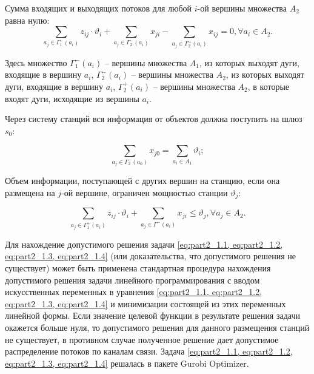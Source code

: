 
Сумма входящих и выходящих потоков для любой $i$-ой вершины множества $A_2$ равна нулю:
% 
\begin{equation}\label{eq:part2_1.2}
    \sum_{a_j \in \Gamma_1^-(a_i)} z_{ij} \cdot \vartheta_i + \sum_{a_j \in \Gamma_2^-(a_i)} x_{ji} -  \sum_{a_j \in \Gamma_2^+(a_i)} x_{ij} =0 ,\forall a_i \in A_2. 
\end{equation}

Здесь множество $\Gamma_1^-(a_i)$ – вершины множества $A_1$, из которых выходят дуги, входящие в вершину $a_i$, $\Gamma_2^-(a_i)$ – вершины множества $A_2$, из которых выходят дуги, входящие в  вершину $a_i$, $\Gamma_2^+(a_i)$ – вершины множества $A_2$, в которые входят дуги, исходящие из вершины $a_i$.

Через систему станций вся информация от объектов должна поступить  на шлюз $s_0$:

\begin{equation}\label{eq:part2_1.3}
    \sum_{a_j \in \Gamma_2^-(a_0)} x_{j0} =  \sum_{a_i \in A_1} \vartheta_i;
\end{equation}

Объем информации, поступающей с других вершин на станцию, если она размещена на $j$-ой вершине, ограничен мощностью станции $\vartheta_j$:

\begin{equation}\label{eq:part2_1.4}
    \sum_{a_j \in \Gamma_1^+(a_i)} z_{ij} \cdot \vartheta_i + \sum_{a_j \in \Gamma^-(a_i)} x_{ji} \leqslant \vartheta_j, \forall a_j \in A_2.
\end{equation}

Для нахождение допустимого решения задачи \cref{eq:part2_1.1, eq:part2_1.2, eq:part2_1.3, eq:part2_1.4} (или доказательства, что допустимого решения не существует) может быть применена стандартная процедура нахождения допустимого решения задачи линейного программирования с вводом искусственных переменных в уравнения \cref{eq:part2_1.1, eq:part2_1.2, eq:part2_1.3, eq:part2_1.4} и минимизации состоящей из этих переменных линейной формы. Если значение целевой функции в результате решения задачи окажется больше нуля, то допустимого решения для данного размещения станций не существует, в противном случае полученное решение дает допустимое распределение потоков по каналам связи. Задача \cref{eq:part2_1.1, eq:part2_1.2, eq:part2_1.3, eq:part2_1.4} решалась в пакете Gurobi Optimizer.

